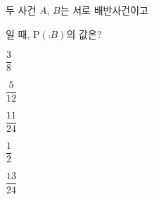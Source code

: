 두 사건 $A$, $B$는 서로 배반사건이고 \par\smallskip{}\par\smallskip\noindent 일 때, $\mathrm{P}(\comp{B})$의 값은?
\begin{choices32}{\rule[-3ex]{0pt}{8ex}$\dfrac{3}{8}$}{\rule[-3ex]{0pt}{8ex}$\dfrac{5}{12}$}{\rule[-3ex]{0pt}{8ex}$\dfrac{11}{24}$}{\rule[-3ex]{0pt}{8ex}$\dfrac{1}{2}$}{\rule[-3ex]{0pt}{8ex}$\dfrac{13}{24}$}\end{choices32}
